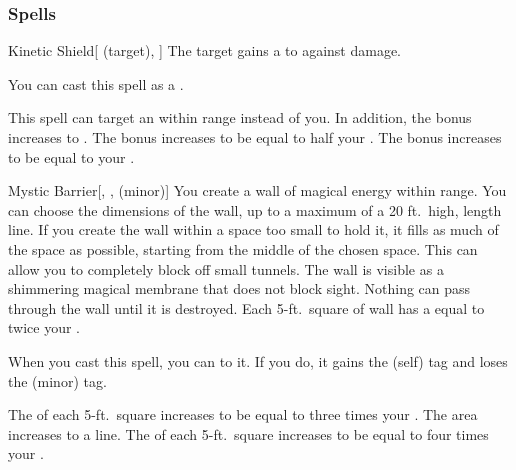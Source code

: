 \subsubsection{Spells}


\lowercase{\hypertarget{spell:Kinetic Shield}{}}\label{spell:Kinetic Shield}
\begin{attuneability}[Rank 1]{\hypertarget{spell:Kinetic Shield}{Kinetic Shield}}[ (target), ]
The target gains a   to  against  damage.

You can cast this spell as a .

\rankline
{} This spell can target an  within \rngmed range instead of you.
In addition, the bonus increases to .
 The bonus increases to be equal to half your .
 The bonus increases to be equal to your .

\end{attuneability}
\vspace{0.25em}



\lowercase{\hypertarget{spell:Mystic Barrier}{}}\label{spell:Mystic Barrier}
\begin{freeability}[Rank 1]{\hypertarget{spell:Mystic Barrier}{Mystic Barrier}}[, ,  (minor)]
\targetrule
You create a wall of magical energy within \rngmed range.
You can choose the dimensions of the wall, up to a maximum of a 20 ft.\ high, \areamed length line.
If you create the wall within a space too small to hold it, it fills as much of the space as possible, starting from the middle of the chosen space.
This can allow you to completely block off small tunnels.
The wall is visible as a shimmering magical membrane that does not block sight.
Nothing can pass through the wall until it is destroyed.
Each 5-ft.\ square of wall has a  equal to twice your .

When you cast this spell, you can  to it.
If you do, it gains the  (self) tag and loses the  (minor) tag.

\rankline
{} The  of each 5-ft.\ square increases to be equal to three times your .
 The area increases to a \arealarge line.
 The  of each 5-ft.\ square increases to be equal to four times your .

\end{freeability}
\vspace{0.25em}



